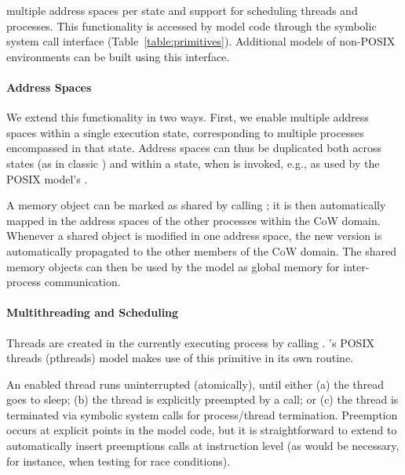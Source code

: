  multiple address spaces per state and support for scheduling threads and processes.  This functionality is accessed by model code through the symbolic system call interface (Table~\ref{table:primitives}).  Additional models of non-POSIX environments can be built using this interface.

\paragraph{Address Spaces}    We extend this functionality in two ways.  First, we enable multiple address spaces within a single execution state, corresponding to multiple processes encompassed in that state. Address spaces can thus be duplicated both across states (as in classic \klee) and within a state, when  is invoked, e.g., as used by the POSIX model's .

  A memory object can be marked as shared by calling ; it is then automatically mapped in the address spaces of the other processes within the CoW domain.  Whenever a shared object is modified in one address space, the new version is automatically propagated to the other members of the CoW domain.  The shared memory objects can then be used by the model as global memory for inter-process communication.

\paragraph{Multithreading and Scheduling}  Threads are created in the currently executing process by calling .  \cnine's POSIX threads (pthreads) model makes use of this primitive in its own  routine.

  An enabled thread runs uninterrupted (atomically), until either (a) the thread goes to sleep; (b) the thread is explicitly preempted by a  call; or (c) the thread is terminated via symbolic system calls for process/thread termination. Preemption occurs at explicit points in the model code, but it is straightforward to extend \cnine to automatically insert preemptions calls at instruction level (as would be necessary, for instance, when testing for race conditions).


